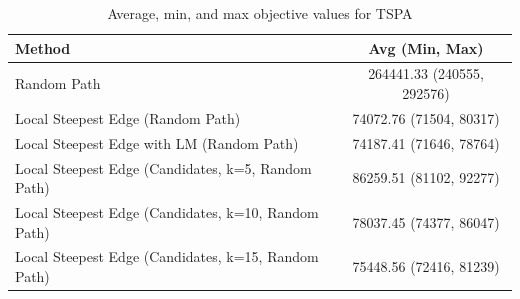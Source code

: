 \begin{table}[h!]
\centering
\begin{tabular}{lc}
\hline
Method & Avg (Min, Max) \\
\hline
Random Path & 264441.33 (240555, 292576) \\
Local Steepest Edge (Random Path) & 74072.76 (71504, 80317) \\
Local Steepest Edge with LM (Random Path) & 74187.41 (71646, 78764) \\
Local Steepest Edge (Candidates, k=5, Random Path) & 86259.51 (81102, 92277) \\
Local Steepest Edge (Candidates, k=10, Random Path) & 78037.45 (74377, 86047) \\
Local Steepest Edge (Candidates, k=15, Random Path) & 75448.56 (72416, 81239) \\
\hline
\end{tabular}
\caption{Average, min, and max objective values for TSPA}
\label{tab:TSPA_scores}
\end{table}
